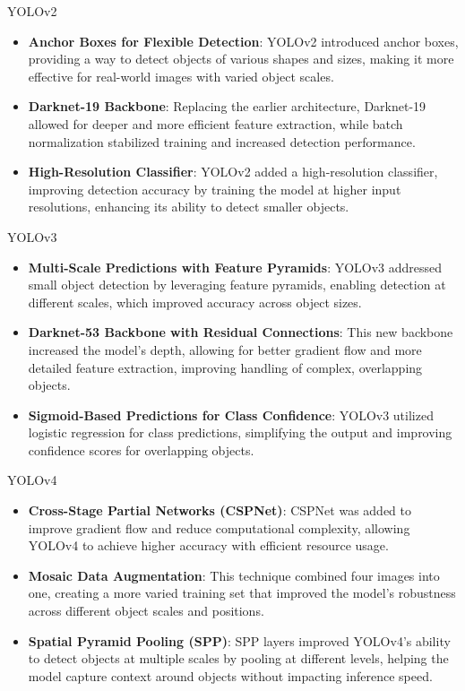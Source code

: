\documentclass[final]{beamer}
\newlength{\colwidth}
\begin{document}
\begin{frame}[t]
\begin{columns}[t]
\begin{column}{\colwidth}
\begin{block}{YOLOv2}
    \begin{itemize}
      \item \textbf{Anchor Boxes for Flexible Detection}: YOLOv2 introduced anchor boxes, providing a way to detect objects of various shapes and sizes, making it more effective for real-world images with varied object scales.
      \item \textbf{Darknet-19 Backbone}: Replacing the earlier architecture, Darknet-19 allowed for deeper and more efficient feature extraction, while batch normalization stabilized training and increased detection performance.
      \item \textbf{High-Resolution Classifier}: YOLOv2 added a high-resolution classifier, improving detection accuracy by training the model at higher input resolutions, enhancing its ability to detect smaller objects.
    \end{itemize}
\end{block}

\begin{block}{YOLOv3}
    \begin{itemize}
      \item \textbf{Multi-Scale Predictions with Feature Pyramids}: YOLOv3 addressed small object detection by leveraging feature pyramids, enabling detection at different scales, which improved accuracy across object sizes.
      \item \textbf{Darknet-53 Backbone with Residual Connections}: This new backbone increased the model’s depth, allowing for better gradient flow and more detailed feature extraction, improving handling of complex, overlapping objects.
      \item \textbf{Sigmoid-Based Predictions for Class Confidence}: YOLOv3 utilized logistic regression for class predictions, simplifying the output and improving confidence scores for overlapping objects.
    \end{itemize}
\end{block}

\begin{block}{YOLOv4}
    \begin{itemize}
      \item \textbf{Cross-Stage Partial Networks (CSPNet)}: CSPNet was added to improve gradient flow and reduce computational complexity, allowing YOLOv4 to achieve higher accuracy with efficient resource usage.
      \item \textbf{Mosaic Data Augmentation}: This technique combined four images into one, creating a more varied training set that improved the model’s robustness across different object scales and positions.
      \item \textbf{Spatial Pyramid Pooling (SPP)}: SPP layers improved YOLOv4’s ability to detect objects at multiple scales by pooling at different levels, helping the model capture context around objects without impacting inference speed.
    \end{itemize}
\end{block}






\end{column}
\end{columns}
\end{frame}
\end{document}

